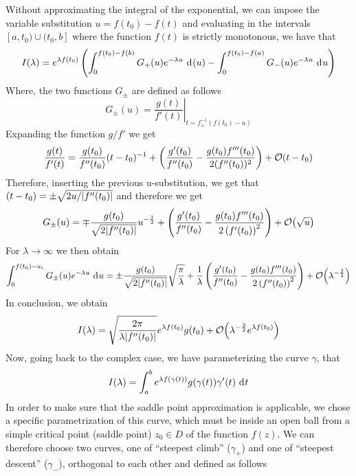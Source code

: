 \documentclass[../qm.tex]{subfiles}
\begin{document}
	Without approximating the integral of the exponential, we can impose the variable substitution $u=f(t_0)-f(t)$ and evaluating in the intervals $[a,t_0)\cup(t_0,b]$ where the function $f(t)$ is strictly monotonous, we have that
	\begin{equation}
		I(\lambda)=e^{\lambda f(t_0)}\left( \int_{0}^{f(t_0)-f(b)}G_+(u)e^{-\lambda u}\ \mathrm{d}^{}(u)-\int_{0}^{f(t_0)-f(a)}G_{-}(u)e^{-\lambda u}\ \mathrm{d}^{}u \right)
		\label{eq:integralnewsub}
	\end{equation}
	Where, the two functions $G_{\pm}$ are defined as follows
	\begin{equation*}
		G_{\pm}(u)=\left.\frac{g(t)}{f'(t)}\right|_{t=f^{-1}_{\pm}(f(t_0)-u)}
	\end{equation*}
	Expanding the function $g/f'$ we get
	\begin{equation}
		\frac{g(t)}{f'(t)}=\frac{g(t_0)}{f''(t_0)}(t-t_0)^{-1}+\left( \frac{g'(t_0)}{f''(t_0)}-\frac{g(t_0)f'''(t_0)}{2(f''(t_0))^2} \right)+\order{t-t_0}
		\label{eq:taylorg/f'}
	\end{equation}
	Therefore, inserting the previous u-substitution, we get that $(t-t_0)=\pm\sqrt{2u/\abs{f''(t_0)}}$ and therefore we get
	\begin{equation}
		G_{\pm}(u)=\mp\frac{g(t_0)}{\sqrt{2\abs{f''(t_0)}}}u^{-\frac{1}{2}}+\left( \frac{g'(t_0)}{f''(t_0)}-\frac{g(t_0)f'''(t_0)}{2\left( f'(t_0) \right)^2} \right)+\order{\sqrt{u}}
		\label{eq:Gpmtaylor}
	\end{equation}
	For $\lambda\to\infty$ we then obtain
	\begin{equation}
		\int_{0}^{f(t_0)-a_i}G_{\pm}(u)e^{-\lambda u}\diff{u}=\pm\frac{g(t_0)}{\sqrt{2\abs{f''(t_0)}}}\sqrt{\frac{\pi}{\lambda}}+\frac{1}{\lambda}\left( \frac{g'(t_0)}{f''(t_0)}-\frac{g(t_0)f'''(t_0)}{2\left( f''(t_0) \right)^2} \right)+\order{\lambda^{-\frac{3}{2}}}
		\label{eq:gpmintegral}
	\end{equation}
	In conclusion, we obtain
	\begin{equation}
		I(\lambda)=\sqrt{\frac{2\pi}{\lambda\abs{f''(t_0)}}}e^{\lambda f(t_0)}g(t_0)+\order{\lambda^{-\frac{3}{2}}e^{\lambda f(t_0)}}
		\label{eq:completeIlambda}
	\end{equation}
	Now, going back to the complex case, we have parameterizing the curve $\gamma$, that
	\begin{equation}
		I(\lambda)=\int_{a}^{b}e^{\lambda f(\gamma(t))}g(\gamma(t))\gamma'(t)\ \mathrm{d}^{}t
		\label{eq:Ilambdacomplexpar}
	\end{equation}
	In order to make sure that the saddle point approximation is applicable, we chose a specific parametrization of this curve, which must be inside an open ball from a simple critical point (saddle point) $z_0\in D$ of the function $f(z)$. We can therefore choose two curves, one of ``steepest climb'' ($\gamma_+$) and one of ``steepest descent'' ($\gamma_-$), orthogonal to each other and defined as follows
\end{document}
